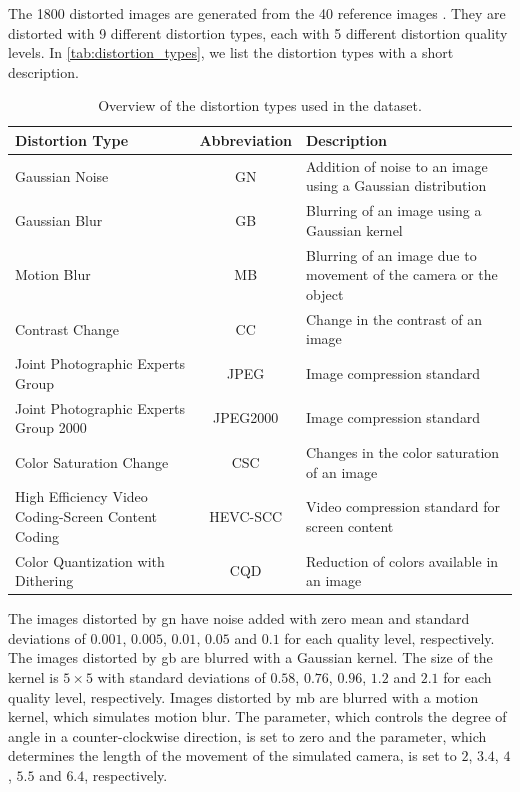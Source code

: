 The 1800 distorted images are generated from the 40 reference images \cite{ni_esim_2017}.
They are distorted with 9 different distortion types, each with 5 different distortion quality levels.
In \autoref{tab:distortion_types}, we list the distortion types with a short description.
\begin{table}
\centering
\caption{Overview of the distortion types used in the dataset.}
\begin{tabular}{|p{6cm}|c|p{6cm}|}
\hline
\textbf{Distortion Type} & \textbf{Abbreviation} & \textbf{Description} \\
\hline
\hline
Gaussian Noise & GN & Addition of noise to an image using a Gaussian distribution \\
\hline
Gaussian Blur & GB & Blurring of an image using a Gaussian kernel \\
\hline
Motion Blur & MB & Blurring of an image due to movement of the camera or the object \\
\hline
Contrast Change & CC & Change in the contrast of an image \\
\hline
Joint Photographic Experts Group & JPEG & Image compression standard \\
\hline
Joint Photographic Experts Group 2000 & JPEG2000 & Image compression standard \\
\hline
Color Saturation Change & CSC & Changes in the color saturation of an image \\
\hline
High Efficiency Video Coding-Screen Content Coding & HEVC-SCC & Video compression standard for screen content \\
\hline
Color Quantization with Dithering & CQD & Reduction of colors available in an image \\
\hline
\end{tabular}
\label{tab:distortion_types}
\end{table}
The images distorted by \gls{gn} have noise added with zero mean and standard deviations of $0.001$, $0.005$, $0.01$, $0.05$ and $0.1$ for each quality level, respectively.
The images distorted by \gls{gb} are blurred with a Gaussian kernel.
The size of the kernel is $5\times5$ with standard deviations of $0.58$, $0.76$, $0.96$, $1.2$ and $2.1$ for each quality level, respectively.
Images distorted by \gls{mb} are blurred with a motion kernel, which simulates motion blur.
The parameter, which controls the degree of angle in a counter-clockwise direction, is set to zero and the parameter, which determines the length of the movement of the simulated camera, is set to $2$, $3.4$, $4$, $5.5$ and $6.4$, respectively.
